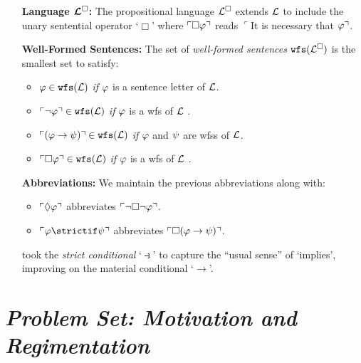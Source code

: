 \documentclass[a4paper, 11pt]{article} %
\begin{document}
\begin{enumerate}[leftmargin=1.2in]
	\item[\bf Language $\boldsymbol{\mathcal{L}^{\square}}$:] The propositional language $\mathcal{L}^{\square}$ extends $\mathcal{L}$ to include the unary sentential operator `$\Box$' where $\ulcorner\Box\varphi\urcorner$ reads $\ulcorner$It is necessary that $\varphi\urcorner$.
	\item[\bf Well-Formed Sentences:] The set of \textit{well-formed sentences} $\texttt{wfs}(\mathcal{L}^{\square})$ is the smallest set to satisfy:
	      \begin{itemize}\small
		      \item $\varphi \in \texttt{wfs}(\mathcal{L})$ \textit{if} $\varphi$ is a sentence letter of $\mathcal{L}$.
		      \item $\ulcorner\neg \varphi\urcorner \in \texttt{wfs}(\mathcal{L})$ \textit{if} $\varphi$ is a wfs of $\mathcal{L}$ .
		      \item $\ulcorner(\varphi \rightarrow \psi)\urcorner \in \texttt{wfs}(\mathcal{L})$ \textit{if} $\varphi$ and $\psi$ are wfss of $\mathcal{L}$.
		      \item $\ulcorner\Box \varphi\urcorner \in \texttt{wfs}(\mathcal{L})$ \textit{if} $\varphi$ is a wfs of $\mathcal{L}$ .
	      \end{itemize}
	\item[\bf Abbreviations:] We maintain the previous abbreviations along with:
	      \begin{itemize}\small
		      \item $\ulcorner\Diamond \varphi\urcorner$ abbreviates $\ulcorner\neg\Box\neg \varphi\urcorner$.
		      \item $\corner{\metaA \strictif \metaB}$ abbreviates $\ulcorner\Box(\varphi \rightarrow \psi)\urcorner$.
	      \end{itemize}
	      \citet{Lewis1932} took the \textit{strict conditional} `$\strictif$' to capture the ``usual sense'' of `implies', improving on the material conditional `$\rightarrow$'.
\end{enumerate}



\section*{\it Problem Set: Motivation and Regimentation}
\end{document}
